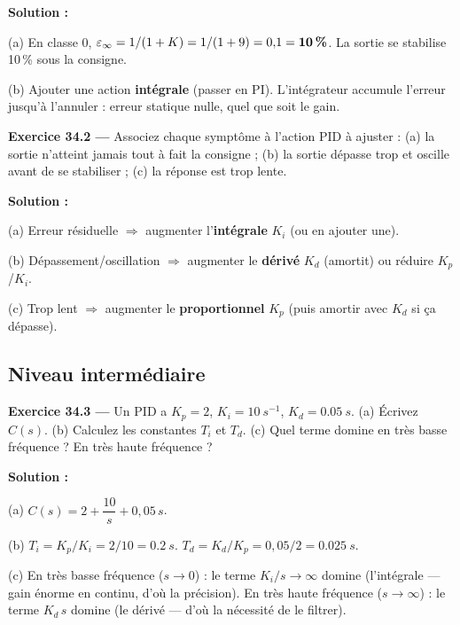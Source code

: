 \documentclass[12pt,a4paper,twoside]{book}
\begin{document}
\begin{pratique}
\textbf{Solution :}

(a) En classe 0, $\varepsilon_\infty = 1/(1+K) = 1/(1+9) = 0{,}1 = \textbf{10\,\%}$. La sortie se stabilise 10\,\% sous la consigne.

(b) Ajouter une action \textbf{intégrale} (passer en PI). L'intégrateur accumule l'erreur jusqu'à l'annuler : erreur statique nulle, quel que soit le gain.
\end{pratique}

\textbf{Exercice 34.2 ---} Associez chaque symptôme à l'action PID à ajuster : (a) la sortie n'atteint jamais tout à fait la consigne ; (b) la sortie dépasse trop et oscille avant de se stabiliser ; (c) la réponse est trop lente.

\begin{pratique}
\textbf{Solution :}

(a) Erreur résiduelle $\Rightarrow$ augmenter l'\textbf{intégrale} $K_i$ (ou en ajouter une).

(b) Dépassement/oscillation $\Rightarrow$ augmenter le \textbf{dérivé} $K_d$ (amortit) ou réduire $K_p$/$K_i$.

(c) Trop lent $\Rightarrow$ augmenter le \textbf{proportionnel} $K_p$ (puis amortir avec $K_d$ si ça dépasse).
\end{pratique}

\subsection*{Niveau intermédiaire}

\textbf{Exercice 34.3 ---} Un PID a $K_p = 2$, $K_i = \SI{10}{s^{-1}}$, $K_d = \SI{0.05}{s}$. (a) Écrivez $C(s)$. (b) Calculez les constantes $T_i$ et $T_d$. (c) Quel terme domine en très basse fréquence ? En très haute fréquence ?

\begin{pratique}
\textbf{Solution :}

(a) $C(s) = 2 + \dfrac{10}{s} + 0{,}05\,s$.

(b) $T_i = K_p/K_i = 2/10 = \SI{0.2}{s}$. $T_d = K_d/K_p = 0{,}05/2 = \SI{0.025}{s}$.

(c) En très basse fréquence ($s \to 0$) : le terme $K_i/s \to \infty$ domine (l'intégrale --- gain énorme en continu, d'où la précision). En très haute fréquence ($s \to \infty$) : le terme $K_d\,s$ domine (le dérivé --- d'où la nécessité de le filtrer).
\end{pratique}
\end{document}
